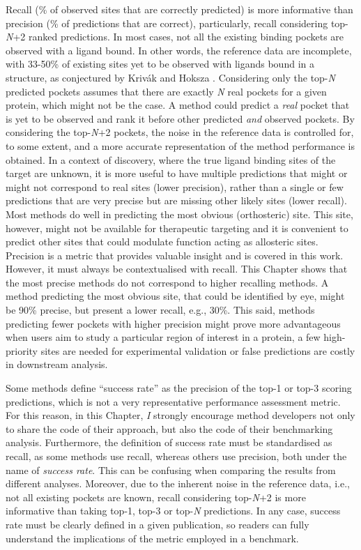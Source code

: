 Recall (\% of observed sites that are correctly predicted) is more informative than precision (\% of predictions that are correct), particularly, recall considering top-\textit{N}+2 ranked predictions. In most cases, not all the existing binding pockets are observed with a ligand bound. In other words, the reference data are incomplete, with 33-50\% of existing sites yet to be observed with ligands bound in a structure, as conjectured by Krivák and Hoksza \cite{KRIVAK_2018_P2RANK}. Considering only the top-\textit{N} predicted pockets assumes that there are exactly \textit{N} real pockets for a given protein, which might not be the case. A method could predict a \textit{real} pocket that is yet to be observed and rank it before other predicted \textit{and} observed pockets. By considering the top-\textit{N}+2 pockets, the noise in the reference data is controlled for, to some extent, and a more accurate representation of the method performance is obtained. In a context of discovery, where the true ligand binding sites of the target are unknown, it is more useful to have multiple predictions that might or might not correspond to real sites (lower precision), rather than a single or few predictions that are very precise but are missing other likely sites (lower recall). Most methods do well in predicting the most obvious (orthosteric) site. This site, however, might not be available for therapeutic targeting and it is convenient to predict other sites that could modulate function acting as allosteric sites. Precision is a metric that provides valuable insight and is covered in this work. However, it must always be contextualised with recall. This Chapter shows that the most precise methods do not correspond to higher recalling methods. A method predicting the most obvious site, that could be identified by eye, might be 90\% precise, but present a lower recall, e.g., 30\%. This said, methods predicting fewer pockets with higher precision might prove more advantageous when users aim to study a particular region of interest in a protein, a few high-priority sites are needed for experimental validation or false predictions are costly in downstream analysis. 

Some methods define ``success rate'' as the precision of the top-1 or top-3 scoring predictions, which is not a very representative performance assessment metric. For this reason, in this Chapter, \textit{I} strongly encourage method developers not only to share the code of their approach, but also the code of their benchmarking analysis. Furthermore, the definition of success rate must be standardised as recall, as some methods use recall, whereas others use precision, both under the name of \textit{success rate}. This can be confusing when comparing the results from different analyses. Moreover, due to the inherent noise in the reference data, i.e., not all existing pockets are known, recall considering top-\textit{N}+2 is more informative than taking top-1, top-3 or top-\textit{N} predictions. In any case, success rate must be clearly defined in a given publication, so readers can fully understand the implications of the metric employed in a benchmark.

